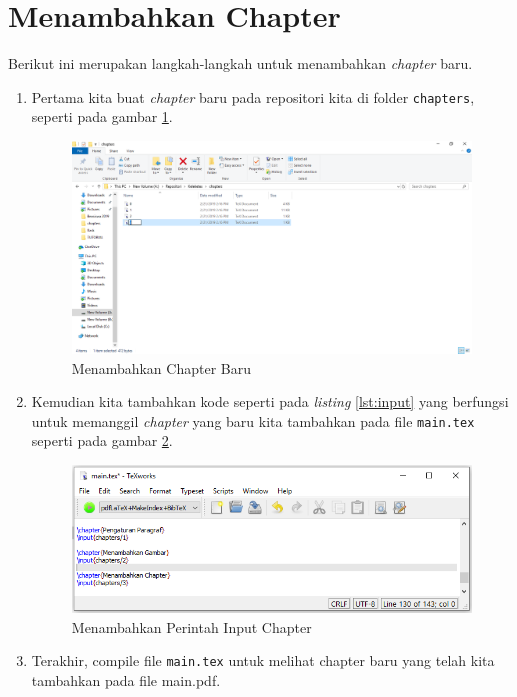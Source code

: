 \section{Menambahkan Chapter}
Berikut ini merupakan langkah-langkah untuk menambahkan \textit{chapter} baru.
\begin{enumerate}
\item Pertama kita buat \textit{chapter} baru pada repositori kita di folder \verb|chapters|, seperti pada gambar \ref{fig:tambahchapter}.

\begin{figure}[!htbp]
  \centering
  \includegraphics[width=.75\textwidth]{figures/tambahchapter.png}
  \caption{Menambahkan Chapter Baru}\label{fig:tambahchapter}
\end{figure}

\item Kemudian kita tambahkan kode seperti pada \textit{listing} \ref{lst:input} yang berfungsi untuk memanggil \textit{chapter} yang baru kita tambahkan pada file \verb|main.tex| seperti pada gambar \ref{fig:inputchapter}.



\begin{figure}[!htbp]
  \centering
  \includegraphics[width=.75\textwidth]{figures/inputchapter.png}
  \caption{Menambahkan Perintah Input Chapter}\label{fig:inputchapter}
\end{figure}

\item Terakhir, compile file \verb|main.tex| untuk melihat chapter baru yang telah kita tambahkan pada file main.pdf.
\end{enumerate}


